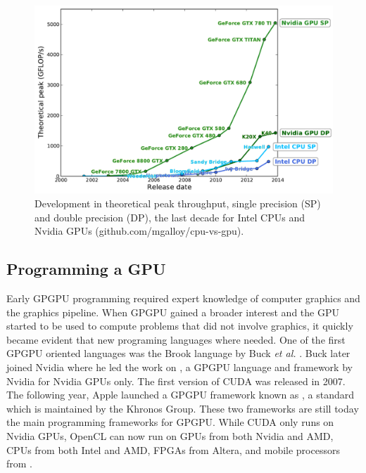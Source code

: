\begin{figure}[t!]
\centering
\includegraphics[width=\textwidth]{img/cpu_vs_gpu.pdf}
\caption{Development in theoretical peak throughput, single precision (SP) and double precision (DP), the last decade for Intel CPUs and Nvidia GPUs (github.com/mgalloy/cpu-vs-gpu).}
\label{fig:cpu_vs_gpu}
\end{figure}

\subsection{Programming a GPU}
Early GPGPU programming required expert knowledge of computer graphics and the graphics pipeline. When GPGPU gained a broader interest and the GPU started to be used to compute problems that did not involve graphics, it quickly became evident that new programing languages where needed.  One of the first GPGPU oriented languages was the Brook language by Buck \textit{et al.} \cite{Buck2004}. Buck later joined Nvidia where he led the work on , a GPGPU language and framework by Nvidia for Nvidia GPUs only. The first version of CUDA was released in 2007. The following year, Apple launched a GPGPU framework known as , a standard which is maintained by the Khronos Group. These two frameworks are still today the main programming frameworks for GPGPU. While CUDA only runs on Nvidia GPUs, OpenCL can now run on GPUs from both Nvidia and AMD, CPUs from both Intel and AMD, FPGAs from Altera, and mobile processors from .

